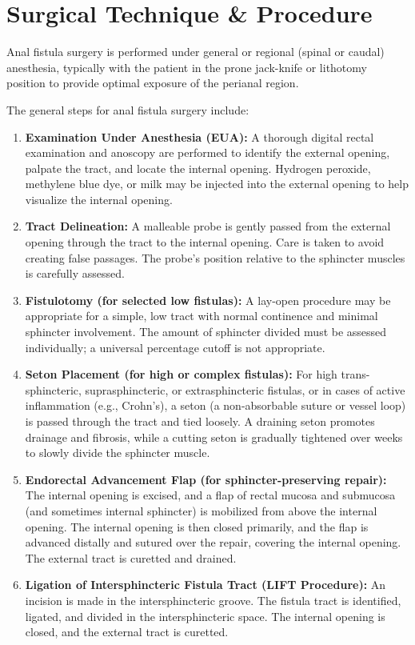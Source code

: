 \section*{Surgical Technique \& Procedure}
Anal fistula surgery is performed under general or regional (spinal or caudal) anesthesia, typically with the patient in the prone jack-knife or lithotomy position to provide optimal exposure of the perianal region.

The general steps for anal fistula surgery include:
\begin{enumerate}
  \item \textbf{Examination Under Anesthesia (EUA):} A thorough digital rectal examination and anoscopy are performed to identify the external opening, palpate the tract, and locate the internal opening. Hydrogen peroxide, methylene blue dye, or milk may be injected into the external opening to help visualize the internal opening.
  \item \textbf{Tract Delineation:} A malleable probe is gently passed from the external opening through the tract to the internal opening. Care is taken to avoid creating false passages. The probe's position relative to the sphincter muscles is carefully assessed.
  \item \textbf{Fistulotomy (for selected low fistulas):} A lay-open procedure may be appropriate for a simple, low tract with normal continence and minimal sphincter involvement. The amount of sphincter divided must be assessed individually; a universal percentage cutoff is not appropriate.
  \item \textbf{Seton Placement (for high or complex fistulas):} For high trans-sphincteric, suprasphincteric, or extrasphincteric fistulas, or in cases of active inflammation (e.g., Crohn's), a seton (a non-absorbable suture or vessel loop) is passed through the tract and tied loosely. A draining seton promotes drainage and fibrosis, while a cutting seton is gradually tightened over weeks to slowly divide the sphincter muscle.
  \item \textbf{Endorectal Advancement Flap (for sphincter-preserving repair):} The internal opening is excised, and a flap of rectal mucosa and submucosa (and sometimes internal sphincter) is mobilized from above the internal opening. The internal opening is then closed primarily, and the flap is advanced distally and sutured over the repair, covering the internal opening. The external tract is curetted and drained.
  \item \textbf{Ligation of Intersphincteric Fistula Tract (LIFT Procedure):} An incision is made in the intersphincteric groove. The fistula tract is identified, ligated, and divided in the intersphincteric space. The internal opening is closed, and the external tract is curetted.

\end{enumerate}
